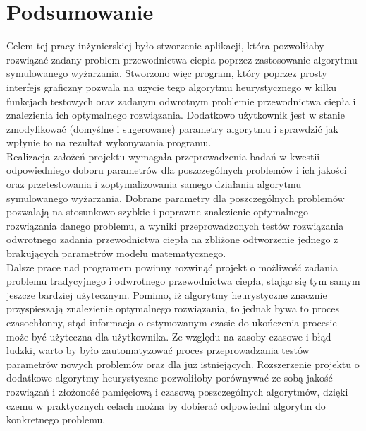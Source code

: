 \documentclass[twoside]{projektInzynierskiMS1}
\newcommand{\si}{ś}
\begin{document}
\section{Podsumowanie}
Celem tej pracy inżynierskiej było stworzenie aplikacji, która pozwoliłaby rozwiązać zadany problem przewodnictwa ciepła poprzez zastosowanie algorytmu symulowanego wyżarzania. Stworzono więc program, który poprzez prosty interfejs graficzny pozwala na użycie tego algorytmu heurystycznego w kilku funkcjach testowych oraz zadanym odwrotnym problemie przewodnictwa ciepła i znalezienia ich optymalnego rozwiązania. Dodatkowo użytkownik jest w stanie zmodyfikować (domy\si lne i sugerowane) parametry algorytmu i sprawdzić jak wpłynie to na rezultat wykonywania programu. \\

Realizacja założeń projektu wymagała przeprowadzenia badań w kwestii odpowiedniego doboru parametrów dla poszczególnych problemów i ich jako\si ci oraz przetestowania i zoptymalizowania samego działania algorytmu symulowanego wyżarzania. Dobrane parametry dla poszczególnych problemów pozwalają na stosunkowo szybkie i poprawne znalezienie optymalnego rozwiązania danego problemu, a wyniki przeprowadzonych testów rozwiązania odwrotnego zadania przewodnictwa ciepła na zbliżone odtworzenie jednego z brakujących parametrów modelu matematycznego. \\

Dalsze prace nad programem powinny rozwinąć projekt o możliwo\si ć zadania problemu tradycyjnego i odwrotnego przewodnictwa ciepła, stając się tym samym jeszcze bardziej użytecznym. Pomimo, iż algorytmy heurystyczne znacznie przyspieszają znalezienie optymalnego rozwiązania, to jednak bywa to proces czasochłonny, stąd informacja o estymowanym czasie do ukończenia procesie może być użyteczna dla użytkownika. Ze względu na zasoby czasowe i błąd ludzki, warto by było zautomatyzować proces przeprowadzania testów parametrów nowych problemów oraz dla już istniejących. Rozszerzenie projektu o dodatkowe algorytmy heurystyczne pozwoliłoby porównywać ze sobą jako\si ć rozwiązań i złożono\si ć pamięciową i czasową poszczególnych algorytmów, dzięki czemu w praktycznych celach można by dobierać odpowiedni algorytm do konkretnego problemu.
\end{document}
